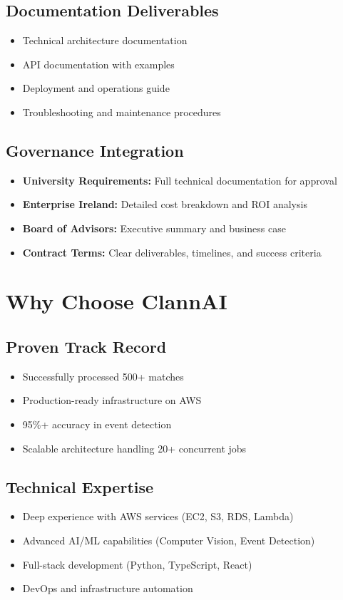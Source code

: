 \documentclass[11pt,a4paper]{article}
\begin{document}
\subsection{Documentation Deliverables}
\begin{itemize}[leftmargin=1.5cm]
    \item Technical architecture documentation
    \item API documentation with examples
    \item Deployment and operations guide
    \item Troubleshooting and maintenance procedures
\end{itemize}

\subsection{Governance Integration}
\begin{itemize}[leftmargin=1.5cm]
    \item \textbf{University Requirements:} Full technical documentation for approval
    \item \textbf{Enterprise Ireland:} Detailed cost breakdown and ROI analysis
    \item \textbf{Board of Advisors:} Executive summary and business case
    \item \textbf{Contract Terms:} Clear deliverables, timelines, and success criteria
\end{itemize}

\section{Why Choose ClannAI}

\subsection{Proven Track Record}
\begin{itemize}[leftmargin=1.5cm]
    \item Successfully processed 500+ matches
    \item Production-ready infrastructure on AWS
    \item 95\%+ accuracy in event detection
    \item Scalable architecture handling 20+ concurrent jobs
\end{itemize}

\subsection{Technical Expertise}
\begin{itemize}[leftmargin=1.5cm]
    \item Deep experience with AWS services (EC2, S3, RDS, Lambda)
    \item Advanced AI/ML capabilities (Computer Vision, Event Detection)
    \item Full-stack development (Python, TypeScript, React)
    \item DevOps and infrastructure automation
\end{itemize}
\end{document}
